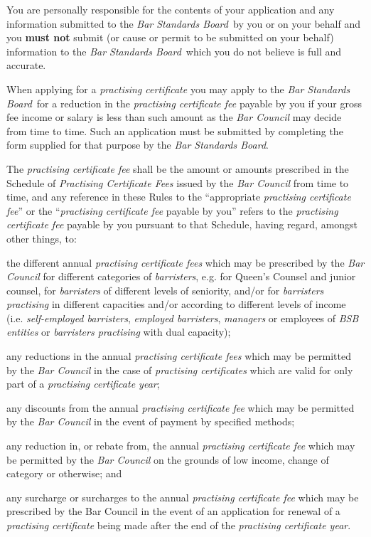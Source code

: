 
You are personally responsible for the contents of your application and
any information submitted to the \emph{Bar Standards Board}~by you or on
your behalf and you \textcolor{myred}{\textbf{must not }}submit (or cause or permit to be submitted
on your behalf) information to the \emph{Bar Standards Board}~which you
do not believe is full and accurate.


When applying for a \emph{practising certificate} you may apply to the
\emph{Bar Standards Board}~for a reduction in the \emph{practising
certificate fee} payable by you if your gross fee income or salary is
less than such amount as the \emph{Bar Council} may decide from time to
time. Such an application must be submitted by completing the form
supplied for that purpose by the \emph{Bar Standards Board}.




The \emph{practising certificate fee} shall be the amount or amounts
prescribed in the Schedule of \emph{Practising Certificate Fees} issued
by the \emph{Bar Council} from time to time, and any reference in these
Rules to the ``appropriate \emph{practising certificate fee}'' or the
``\emph{practising certificate fee} payable by you'' refers to the
\emph{practising certificate fee} payable by you pursuant to that
Schedule, having regard, amongst other things, to:\nl\item the different annual \emph{practising certificate fees} which may be
prescribed by the \emph{Bar Council} for different categories of
\emph{barristers}, e.g. for Queen's Counsel and junior counsel, for
\emph{barristers} of different levels of seniority, and/or for
\emph{barristers} \emph{practising} in different capacities and/or
according to different levels of income (i.e. \emph{self-employed
barristers}, \emph{employed barristers}, \emph{managers} or employees of
\emph{BSB entities} or \emph{barristers practising} with dual capacity);
\item any reductions in the annual \emph{practising certificate fees} which
may be permitted by the \emph{Bar Council} in the case of
\emph{practising certificates} which are valid for only part of a
\emph{practising certificate year};
\item any discounts from the annual \emph{practising certificate fee} which
may be permitted by the \emph{Bar Council} in the event of payment by
specified methods;
\item any reduction in, or rebate from, the annual \emph{practising
certificate fee} which may be permitted by the \emph{Bar Council} on the
grounds of low income, change of category or otherwise; and
\item any surcharge or surcharges to the annual \emph{practising
certificate fee} which may be prescribed by the Bar Council in the event
of an application for renewal of a \emph{practising certificate} being
made after the end of the \emph{practising certificate year}.
\ln
{}

